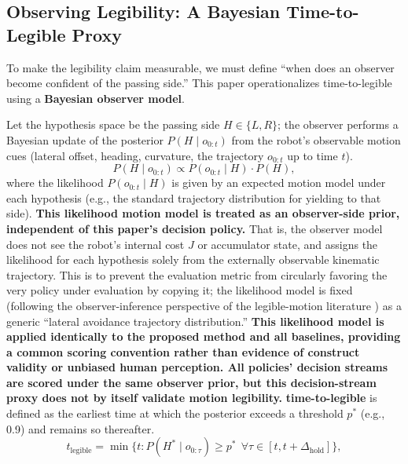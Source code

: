\subsection{Observing Legibility: A Bayesian Time-to-Legible Proxy}\label{subsec:observer}

To make the legibility claim measurable, we must define ``when does an observer become confident of the passing side.'' This paper operationalizes time-to-legible using a \textbf{Bayesian observer model}.

Let the hypothesis space be the passing side $H \in \{L, R\}$; the observer performs a Bayesian update of the posterior $P(H \mid o_{0:t})$ from the robot's observable motion cues (lateral offset, heading, curvature, the trajectory $o_{0:t}$ up to time $t$).
\begin{equation}\label{eq:posterior}
P(H \mid o_{0:t}) \propto P(o_{0:t} \mid H) \cdot P(H),
\end{equation}
where the likelihood $P(o_{0:t} \mid H)$ is given by an expected motion model under each hypothesis (e.g., the standard trajectory distribution for yielding to that side). \textbf{This likelihood motion model is treated as an observer-side prior, independent of this paper's decision policy.} That is, the observer model does not see the robot's internal cost $J$ or accumulator state, and assigns the likelihood for each hypothesis solely from the externally observable kinematic trajectory. This is to prevent the evaluation metric from circularly favoring the very policy under evaluation by copying it; the likelihood model is fixed (following the observer-inference perspective of the legible-motion literature \citep{dragan2013legibility}) as a generic ``lateral avoidance trajectory distribution.'' \textbf{This likelihood model is applied identically to the proposed method and all baselines, providing a common scoring convention rather than evidence of construct validity or unbiased human perception. All policies' decision streams are scored under the same observer prior, but this decision-stream proxy does not by itself validate motion legibility.} \textbf{time-to-legible} is defined as the earliest time at which the posterior exceeds a threshold $p^*$ (e.g., 0.9) and remains so thereafter.
\begin{equation}\label{eq:tlegible}
t_{\text{legible}} = \min\{t : P(H^* \mid o_{0:\tau}) \ge p^* \ \ \forall \tau \in [t, t+\Delta_{\text{hold}}]\},
\end{equation}
